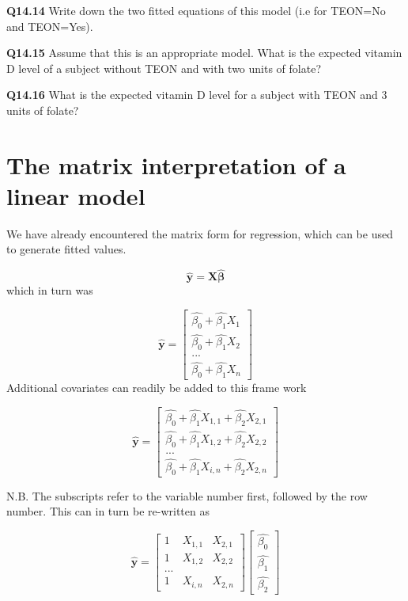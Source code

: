 \documentclass[
  oneside]{krantz}
\begin{document}
\textbf{Q14.14} Write down the two fitted equations of this model (i.e for TEON=No and TEON=Yes).

\textbf{Q14.15} Assume that this is an appropriate model. What is the expected vitamin D level of a subject without TEON and with two units of folate?

\textbf{Q14.16} What is the expected vitamin D level for a subject with TEON and 3 units of folate?

\hypertarget{the-matrix-interpretation-of-a-linear-model}{%
\section{The matrix interpretation of a linear model}\label{the-matrix-interpretation-of-a-linear-model}}

We have already encountered the matrix form for regression, which can be used to generate fitted values.

\[ \hat{\mathbf{y}} = \mathbf{X} \hat{\boldsymbol{\beta}} \]
which in turn was

\[\hat{\mathbf{y}} = 
\left[\begin{array}
{r}
\hat{\beta_0}+\hat{\beta_1} X_1 \\
 \hat{\beta_0}+\hat{\beta_1} X_2 \\  
...\\
\hat{\beta_0}+\hat{\beta_1} X_n
\end{array}\right]
\]
Additional covariates can readily be added to this frame work

\[
\hat{\mathbf{y}} =
\left[\begin{array}
{r}
\hat{\beta_0}+\hat{\beta_1} X_{1,1}+ \hat{\beta_2} X_{2,1}\\
 \hat{\beta_0}+\hat{\beta_1} X_{1,2} + \hat{\beta_2} X_{2,2}\\  
...\\
\hat{\beta_0}+\hat{\beta_1} X_{i,n}+ \hat{\beta_2} X_{2,n} 
\end{array}\right]
\]

N.B. The subscripts refer to the variable number first, followed by the row number. This can in turn be re-written as

\[\hat{\mathbf{y}} = 
\left[\begin{array}
{ccc}
1 & X_{1,1} &  X_{2,1}\\
 1 & X_{1,2} &  X_{2,2}\\  
...\\
1 & X_{i,n} & X_{2,n} 
\end{array}\right]
\left[\begin{array}
{r}
\hat{\beta_0}  \\
\hat{\beta_1}  \\
\hat{\beta_2}
\end{array}\right]
\]
\end{document}

